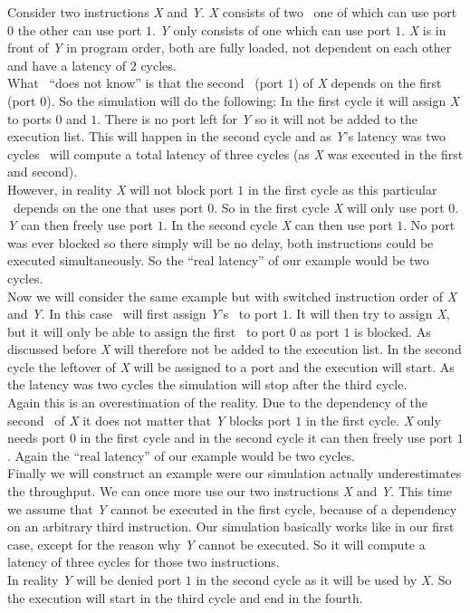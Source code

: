 Consider two instructions \emph{X} and \emph{Y}. \emph{X} consists of two \microops\ one of which can use port $0$ the other can use port $1$. \emph{Y} only consists of one which can use port $1$. \emph{X} is in front of \emph{Y} in program order, both are fully loaded, not dependent on each other and have a latency of $2$ cycles.\\
What \suaca\ ``does not know'' is that the second \microop\ (port $1$) of \emph{X} depends on the first (port $0$). So the simulation will do the following: In the first cycle it will assign \emph{X} to ports $0$ and $1$. There is no port left for \emph{Y} so it will not be added to the execution list. This will happen in the second cycle and as \emph{Y}'s latency was two cycles \suaca\ will compute a total latency of three cycles (as \emph{X} was executed in the first and second).\\
However, in reality \emph{X} will not block port $1$ in the first cycle as this particular \microop\ depends on the one that uses port $0$. So in the first cycle \emph{X} will only use port $0$. \emph{Y} can then freely use port $1$. In the second cycle \emph{X} can then use port $1$. No port was ever blocked so there simply will be no delay, both instructions could be executed simultaneously. So the ``real latency'' of our example would be two cycles.\\

Now we will consider the same example but with switched instruction order of \emph{X} and \emph{Y}. In this case \suaca\ will first assign \emph{Y}'s \microop\ to port $1$. It will then try to assign \emph{X}, but it will only be able to assign the first \microop\ to port $0$ as port $1$ is blocked. As discussed before \emph{X} will therefore not be added to the execution list. In the second cycle the leftover of \emph{X} will be assigned to a port and the execution will start. As the latency was two cycles the simulation will stop after the third cycle.\\
Again this is an overestimation of the reality. Due to the dependency of the second \microop\ of \emph{X} it does not matter that \emph{Y} blocks port $1$ in the first cycle. \emph{X} only needs port $0$ in the first cycle and in the second cycle it can then freely use port $1$. Again the ``real latency'' of our example would be two cycles.\\

Finally we will construct an example were our simulation actually underestimates the throughput. We can once more use our two instructions \emph{X} and \emph{Y}. This time we assume that \emph{Y} cannot be executed in the first cycle, because of a dependency on an arbitrary third instruction. Our simulation basically works like in our first case, except for the reason why \emph{Y} cannot be executed. So it will compute a latency of three cycles for those two instructions.\\
In reality \emph{Y} will be denied port $1$ in the second cycle as it will be used by \emph{X}. So the execution will start in the third cycle and end in the fourth.\\

